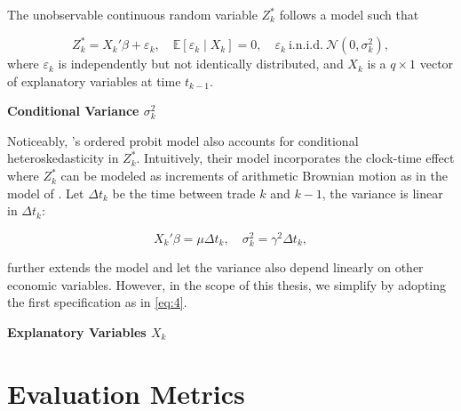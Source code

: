 The unobservable continuous random variable $Z^*_k$ follows a model such that

\begin{equation}
Z_k^* = X_k' \beta + \varepsilon_k, \quad \mathbb{E}[\varepsilon_k \mid X_k] = 0, \quad \varepsilon_k \ \text{i.n.i.d.} \ \mathcal{N}(0, \sigma_k^2),
    \label{eq:3}
\end{equation}
where \(\varepsilon_k\) is independently but not identically distributed, and $X_k$ is a \(q\times1\) vector of explanatory variables at time $t_{k-1}$.

{\noindent\bfseries Conditional Variance \(\sigma_k^2\)}

Noticeably, \citet{hausman1992}'s ordered probit model also accounts for conditional heteroskedasticity in $Z^*_k$. Intuitively, their model incorporates the clock-time effect where $Z^*_k$ can be modeled as increments of arithmetic Brownian motion as in the model of \citet{chofrees1988}. Let \(\Delta t_k\) be the time between trade $k$ and $k-1$, the variance is linear in \(\Delta t_k\):

\begin{equation}
X_k' \beta = \mu \Delta t_k, \quad \sigma_k^2 = \gamma^2 \Delta t_k,
    \label{eq:4}
\end{equation}

\citet{hausman1992} further extends the model and let the variance also depend linearly on other economic variables. However, in the scope of this thesis, we simplify by adopting the first specification as in \eqref{eq:4}.

{\noindent\bfseries Explanatory Variables $X_k$ }

















\section{Evaluation Metrics}